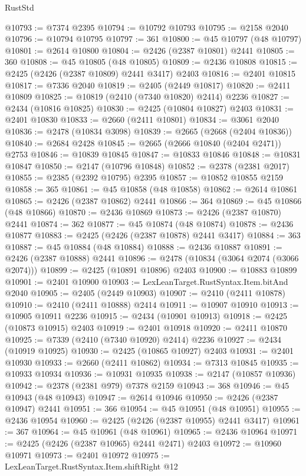 \begin{lexlean}{RustStd}
\begin{coremodule}
@10793 := @7374 @2395
@10794 := @10792 @10793
@10795 := @2158 @2040
@10796 := @10794 @10795
@10797 := 361
@10800 := @45 @10797 (@48 @10797)
@10801 := @2614 @10800
@10804 := @2426 (@2387 @10801) @2441
@10805 := 360
@10808 := @45 @10805 (@48 @10805)
@10809 := @2436 @10808
@10815 := @2425 (@2426 (@2387 @10809) @2441 @3417) @2403
@10816 := @2401 @10815
@10817 := @7336 @2040
@10819 := @2405 (@2449 @10817)
@10820 := @2411 @10809
@10825 := @10819 (@2410 (@7340 @10820) @2414) @2236
@10827 := @2434 (@10816 @10825)
@10830 := @2425 (@10804 @10827) @2403
@10831 := @2401 @10830
@10833 := @2660 (@2411 @10801)
@10834 := @3061 @2040
@10836 := @2478 (@10834 @3098)
@10839 := @2665 (@2668 (@2404 @10836))
@10840 := @2684 @2428
@10845 := @2665 (@2666 @10840 (@2404 @2471)) @2753
@10846 := @10839 @10845
@10847 := @10833 @10846
@10848 := @10831 @10847
@10850 := @2147 (@10796 @10848)
@10852 := @2378 (@2381 @2017)
@10855 := @2385 (@2392 @10795) @2395
@10857 := @10852 @10855 @2159
@10858 := 365
@10861 := @45 @10858 (@48 @10858)
@10862 := @2614 @10861
@10865 := @2426 (@2387 @10862) @2441
@10866 := 364
@10869 := @45 @10866 (@48 @10866)
@10870 := @2436 @10869
@10873 := @2426 (@2387 @10870) @2441
@10874 := 362
@10877 := @45 @10874 (@48 @10874)
@10878 := @2436 @10877
@10883 := @2425 (@2426 (@2387 @10878) @2441 @3417)
@10884 := 363
@10887 := @45 @10884 (@48 @10884)
@10888 := @2436 @10887
@10891 := @2426 (@2387 @10888) @2441
@10896 := @2478 (@10834 (@3064 @2074 (@3066 @2074)))
@10899 := @2425 (@10891 @10896) @2403
@10900 := @10883 @10899
@10901 := @2401 @10900
@10903 := LexLeanTarget.RustSyntax.Item.bitAnd @2040
@10905 := @2405 (@2449 @10903)
@10907 := @2410 (@2411 @10878)
@10910 := @2410 (@2411 @10888) @2414
@10911 := @10907 @10910
@10913 := @10905 @10911 @2236
@10915 := @2434 (@10901 @10913)
@10918 := @2425 (@10873 @10915) @2403
@10919 := @2401 @10918
@10920 := @2411 @10870
@10925 := @7339 (@2410 (@7340 @10920) @2414) @2236
@10927 := @2434 (@10919 @10925)
@10930 := @2425 (@10865 @10927) @2403
@10931 := @2401 @10930
@10933 := @2660 (@2411 @10862)
@10934 := @7313 @10845
@10935 := @10933 @10934
@10936 := @10931 @10935
@10938 := @2147 (@10857 @10936)
@10942 := @2378 (@2381 @979) @7378 @2159
@10943 := 368
@10946 := @45 @10943 (@48 @10943)
@10947 := @2614 @10946
@10950 := @2426 (@2387 @10947) @2441
@10951 := 366
@10954 := @45 @10951 (@48 @10951)
@10955 := @2436 @10954
@10960 := @2425 (@2426 (@2387 @10955) @2441 @3417)
@10961 := 367
@10964 := @45 @10961 (@48 @10961)
@10965 := @2436 @10964
@10971 := @2425 (@2426 (@2387 @10965) @2441 @2471) @2403
@10972 := @10960 @10971
@10973 := @2401 @10972
@10975 := LexLeanTarget.RustSyntax.Item.shiftRight @12

\end{coremodule}
\end{lexlean}
